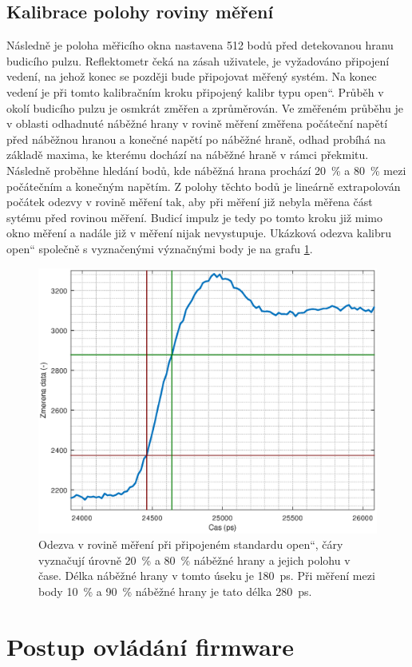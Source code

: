 \subsection{Kalibrace polohy roviny měření}
Následně je poloha měřicího okna nastavena 512 bodů před detekovanou hranu budicího pulzu. Reflektometr čeká na zásah uživatele, je vyžadováno připojení vedení, na jehož konec se později bude připojovat měřený systém. Na konec vedení je při tomto kalibračním kroku připojený kalibr typu \quotedblbase open\textquotedblleft. Průběh v okolí budicího pulzu je osmkrát změřen a zprůměrován. Ve změřeném průběhu je v oblasti odhadnuté náběžné hrany v rovině měření změřena počáteční napětí před náběžnou hranou a konečné napětí po náběžné hraně, odhad probíhá na základě maxima, ke kterému dochází na náběžné hraně v rámci překmitu. Následně proběhne hledání bodů, kde náběžná hrana prochází \SI{20}{\percent} a \SI{80}{\percent} mezi počátečním a konečným napětím. Z polohy těchto bodů je lineárně extrapolován počátek odezvy v rovině měření tak, aby při měření již nebyla měřena část sytému před rovinou měření. Budicí impulz je tedy po tomto kroku již mimo okno měření a nadále již v měření nijak nevystupuje. Ukázková odezva kalibru \quotedblbase open\textquotedblleft{} společně s vyznačenými význačnými body je na grafu \ref{rising_edge_DUT_open}.

\begin{figure}[htbp]
\includegraphics[width=\textwidth,keepaspectratio]{images/rising_edge_DUT_open.eps}\caption{Odezva v rovině měření při připojeném standardu \quotedblbase open\textquotedblleft , čáry vyznačují úrovně \SI{20}{\percent} a \SI{80}{\percent} náběžné hrany a jejich polohu v čase. Délka náběžné hrany v tomto úseku je \SI{180}{\pico\second}. Při měření mezi body \SI{10}{\percent} a \SI{90}{\percent} náběžné hrany je tato délka \SI{280}{\pico\second}.}\label{rising_edge_DUT_open}
\end{figure}

\section{Postup ovládání firmware}

